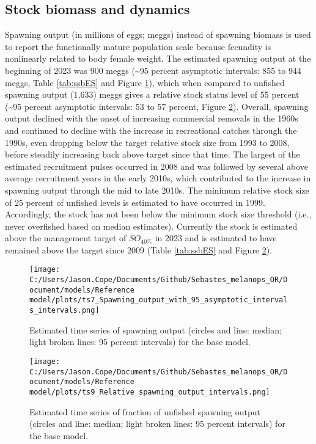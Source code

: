 \documentclass[11pt,
  english,
  letterpaper,
]{article}
\begin{document}
\hypertarget{stock-biomass-and-dynamics}{%
\subsection*{Stock biomass and dynamics}\label{stock-biomass-and-dynamics}}

Spawning output (in millions of eggs; meggs) instead of spawning biomass is used to report the functionally mature population scale because fecundity is nonlinearly related to body female weight. The estimated spawning output at the beginning of 2023 was 900 meggs (\textasciitilde95 percent asymptotic intervals: 855 to 944 meggs, Table \ref{tab:ssbES} and Figure \ref{fig:es-ssb}), which when compared to unfished spawning output (1,633) meggs gives a relative stock status level of 55 percent (\textasciitilde95 percent asymptotic intervals: 53 to 57 percent, Figure \ref{fig:es-depl}). Overall, spawning output declined with the onset of increasing commercial removals in the 1960s and continued to decline with the increase in recreational catches through the 1990s, even dropping below the target relative stock size from 1993 to 2008, before steadily increasing back above target since that time. The largest of the estimated recruitment pulses occurred in 2008 and was followed by several above average recruitment years in the early 2010s, which contributed to the increase in spawning output through the mid to late 2010s. The minimum relative stock size of 25 percent of unfished levels is estimated to have occurred in 1999. Accordingly, the stock has not been below the minimum stock size threshold (i.e., never overfished based on median estimates). Currently the stock is estimated above the management target of \(SO_{40\%}\) in 2023 and is estimated to have remained above the target since 2009 (Table \ref{tab:ssbES} and Figure \ref{fig:es-depl}).



\begin{figure}
\centering
\texttt{[image: C:/Users/Jason.Cope/Documents/Github/Sebastes\_melanops\_OR/Document/models/Reference model/plots/ts7\_Spawning\_output\_with\_95\_asymptotic\_intervals\_intervals.png]}
\caption{Estimated time series of spawning output (circles and line: median; light broken lines: 95 percent intervals) for the base model.\label{fig:es-ssb}}
\end{figure}

\begin{figure}
\centering
\texttt{[image: C:/Users/Jason.Cope/Documents/Github/Sebastes\_melanops\_OR/Document/models/Reference model/plots/ts9\_Relative\_spawning\_output\_intervals.png]}
\caption{Estimated time series of fraction of unfished spawning output (circles and line: median; light broken lines: 95 percent intervals) for the base model.\label{fig:es-depl}}
\end{figure}
\end{document}
